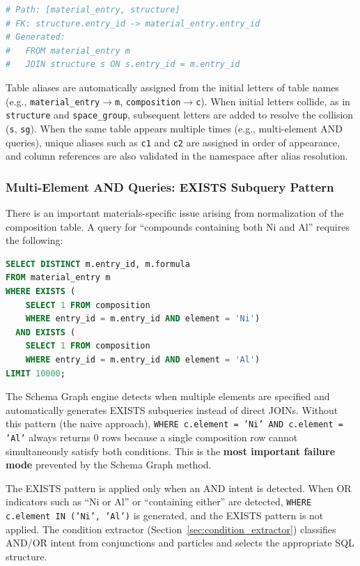 \documentclass[5p,twocolumn]{elsarticle}
\begin{document}
\begin{lstlisting}[language=Python,caption={JOIN clause generation from paths.},label=lst:join_gen,numbers=none]
# Path: [material_entry, structure]
# FK: structure.entry_id -> material_entry.entry_id
# Generated:
#   FROM material_entry m
#   JOIN structure s ON s.entry_id = m.entry_id
\end{lstlisting}

Table aliases are automatically assigned from the initial letters of table names
(e.g., \texttt{material\_entry}$\to$\texttt{m}, \texttt{composition}$\to$\texttt{c}).
When initial letters collide, as in \texttt{structure} and \texttt{space\_group},
subsequent letters are added to resolve the collision (\texttt{s}, \texttt{sg}).
When the same table appears multiple times (e.g., multi-element AND queries),
unique aliases such as \texttt{c1} and \texttt{c2} are assigned in order of appearance,
and column references are also validated in the namespace after alias resolution.

\subsubsection{Multi-Element AND Queries: EXISTS Subquery Pattern}
\label{sec:multi_element}

There is an important materials-specific issue arising from normalization of the composition table.
A query for ``compounds containing both Ni and Al'' requires the following:

\begin{lstlisting}[language=SQL,caption={Multi-element AND query using EXISTS subqueries.},label=lst:exists]
SELECT DISTINCT m.entry_id, m.formula
FROM material_entry m
WHERE EXISTS (
    SELECT 1 FROM composition
    WHERE entry_id = m.entry_id AND element = 'Ni')
  AND EXISTS (
    SELECT 1 FROM composition
    WHERE entry_id = m.entry_id AND element = 'Al')
LIMIT 10000;
\end{lstlisting}

The Schema Graph engine detects when multiple elements are specified
and automatically generates EXISTS subqueries instead of direct JOINs.
Without this pattern (the naive approach),
\texttt{WHERE c.element = 'Ni' AND c.element = 'Al'} always returns 0 rows
because a single composition row cannot simultaneously satisfy both conditions.
This is the \textbf{most important failure mode} prevented by the Schema Graph method.

The EXISTS pattern is applied only when an AND intent is detected.
When OR indicators such as ``Ni or Al'' or ``containing either'' are detected,
\texttt{WHERE c.element IN ('Ni', 'Al')} is generated, and the EXISTS pattern is not applied.
The condition extractor (Section~\ref{sec:condition_extractor}) classifies
AND/OR intent from conjunctions and particles and selects the appropriate SQL structure.
\end{document}
